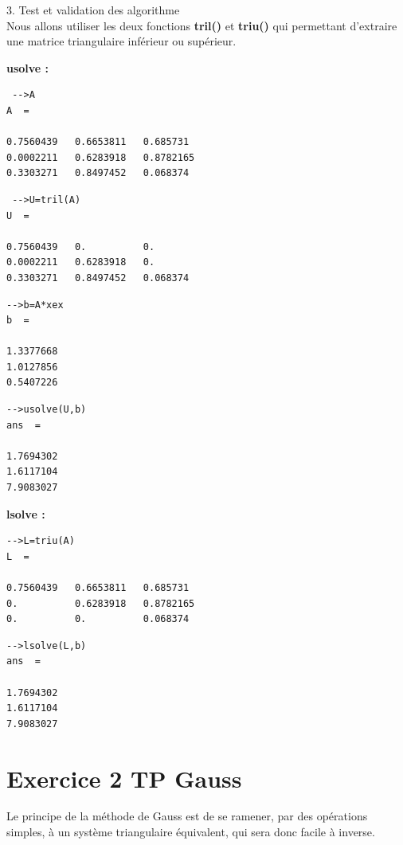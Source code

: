 \documentclass[12pt]{report}
\begin{document}
3. Test et validation des algorithme\\

Nous allons utiliser les deux fonctions \textbf{tril()} et \textbf{triu()} qui permettant d'extraire une matrice triangulaire inférieur ou supérieur.

\textbf{usolve :}\\

\begin{lstlisting}
 -->A
A  = 

0.7560439   0.6653811   0.685731      
0.0002211   0.6283918   0.8782165      
0.3303271   0.8497452   0.068374
\end{lstlisting} 

\begin{lstlisting}
 -->U=tril(A)
U  = 

0.7560439   0.          0.      
0.0002211   0.6283918   0.      
0.3303271   0.8497452   0.068374
\end{lstlisting} 

\begin{lstlisting}
-->b=A*xex 
b  = 

1.3377668
1.0127856
0.5407226
\end{lstlisting} 

\begin{lstlisting}
-->usolve(U,b)
ans  =

1.7694302
1.6117104
7.9083027
\end{lstlisting} 

\textbf{lsolve :}\\

\begin{lstlisting}
-->L=triu(A)
L  = 

0.7560439   0.6653811   0.685731 
0.          0.6283918   0.8782165
0.          0.          0.068374 
\end{lstlisting} 

\begin{lstlisting}
-->lsolve(L,b)
ans  =

1.7694302
1.6117104
7.9083027
\end{lstlisting}

\section{Exercice 2 TP Gauss}
 Le principe de la méthode de Gauss est de se ramener, par des opérations simples, à un système triangulaire équivalent, qui sera donc facile à inverse.\\
\end{document}
